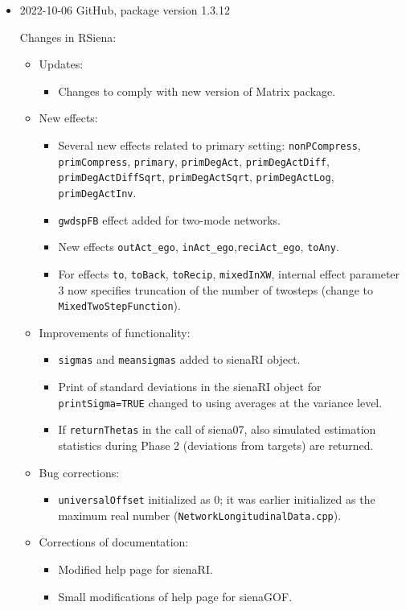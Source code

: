 \documentclass[a4paper,fleqn,11pt]{article}
\newcommand{\+}{\, + \,}
\newcommand{\sfn}[1]{\textsf{#1}}
\begin{document}
\begin{small}
\begin{itemize}
\item 2022-10-06 GitHub, package version 1.3.12

Changes in RSiena:
\begin{itemize}
\item Updates:
   \begin{itemize}
   \item Changes to comply with new version of \sfn{Matrix} package.
    \end{itemize}
\item New effects:
   \begin{itemize}
  \item Several new effects related to primary setting:
    \texttt{nonPCompress}, \texttt{primCompress}, \texttt{primary}, \texttt{primDegAct},
    \texttt{primDegActDiff}, \texttt{primDegActDiffSqrt}, \texttt{primDegActSqrt},
    \texttt{primDegActLog}, \texttt{primDegActInv}.
  \item \texttt{gwdspFB} effect added for two-mode networks.
  \item New effects \texttt{outAct\_ego}, \texttt{inAct\_ego},\texttt{reciAct\_ego}, \texttt{toAny}.
  \item For effects \texttt{to}, \texttt{toBack}, \texttt{toRecip}, \texttt{mixedInXW},
    internal effect parameter 3 now specifies truncation of the number of
    twosteps (change to \texttt{MixedTwoStepFunction}).
    \end{itemize}
\item Improvements of functionality:
   \begin{itemize}
  \item \texttt{sigmas} and \texttt{meansigmas} added to \sfn{sienaRI} object.
  \item Print of standard deviations in the \sfn{sienaRI} object for \texttt{printSigma=TRUE}
    changed to using averages at the variance level.
  \item If \texttt{returnThetas} in the call of \sfn{siena07}, also simulated estimation statistics
    during Phase 2 (deviations from targets) are returned.
    \end{itemize}
\item Bug corrections:
   \begin{itemize}
  \item \texttt{universalOffset} initialized as 0; it was earlier initialized as
    the maximum real number (\texttt{NetworkLongitudinalData.cpp}).
    \end{itemize}
\item Corrections of documentation:
   \begin{itemize}
  \item Modified help page for \sfn{sienaRI}.
  \item Small modifications of help page for \sfn{sienaGOF}.
   \end{itemize}
\end{itemize}


\end{itemize}
\end{small}
\end{document}
